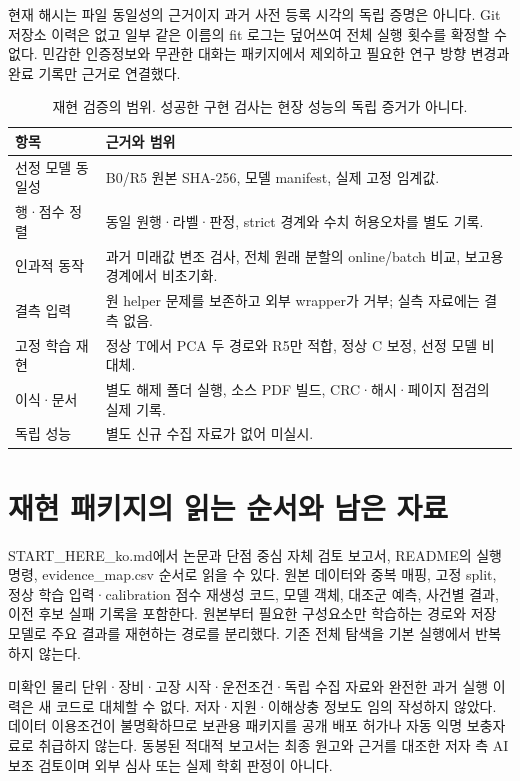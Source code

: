 \documentclass{article}
\begin{document}
현재 해시는 파일 동일성의 근거이지 과거 사전 등록 시각의 독립 증명은 아니다. Git 저장소 이력은 없고 일부 같은 이름의 fit 로그는 덮어쓰여 전체 실행 횟수를 확정할 수 없다. 민감한 인증정보와 무관한 대화는 패키지에서 제외하고 필요한 연구 방향 변경과 완료 기록만 근거로 연결했다.

\begin{table}[!ht]\centering\caption{재현 검증의 범위. 성공한 구현 검사는 현장 성능의 독립 증거가 아니다.}\begin{tabularx}{\textwidth}{lX}\toprule
항목 & 근거와 범위\\\midrule
선정 모델 동일성 & B0/R5 원본 SHA-256, 모델 manifest, 실제 고정 임계값.\\
행·점수 정렬 & 동일 원행·라벨·판정, strict 경계와 수치 허용오차를 별도 기록.\\
인과적 동작 & 과거 미래값 변조 검사, 전체 원래 분할의 online/batch 비교, 보고용 경계에서 비초기화.\\
결측 입력 & 원 helper 문제를 보존하고 외부 wrapper가 거부; 실측 자료에는 결측 없음.\\
고정 학습 재현 & 정상 T에서 PCA 두 경로와 R5만 적합, 정상 C 보정, 선정 모델 비대체.\\
이식·문서 & 별도 해제 폴더 실행, 소스 PDF 빌드, CRC·해시·페이지 점검의 실제 기록.\\
독립 성능 & 별도 신규 수집 자료가 없어 미실시.\\\bottomrule\end{tabularx}\end{table}

\section{재현 패키지의 읽는 순서와 남은 자료}
START\_HERE\_ko.md에서 논문과 단점 중심 자체 검토 보고서, README의 실행 명령, evidence\_map.csv 순서로 읽을 수 있다. 원본 데이터와 중복 매핑, 고정 split, 정상 학습 입력·calibration 점수 재생성 코드, 모델 객체, 대조군 예측, 사건별 결과, 이전 후보 실패 기록을 포함한다. 원본부터 필요한 구성요소만 학습하는 경로와 저장 모델로 주요 결과를 재현하는 경로를 분리했다. 기존 전체 탐색을 기본 실행에서 반복하지 않는다.

미확인 물리 단위·장비·고장 시작·운전조건·독립 수집 자료와 완전한 과거 실행 이력은 새 코드로 대체할 수 없다. 저자·지원·이해상충 정보도 임의 작성하지 않았다. 데이터 이용조건이 불명확하므로 보관용 패키지를 공개 배포 허가나 자동 익명 보충자료로 취급하지 않는다. 동봉된 적대적 보고서는 최종 원고와 근거를 대조한 저자 측 AI 보조 검토이며 외부 심사 또는 실제 학회 판정이 아니다.
\end{document}
